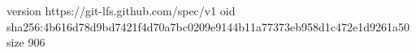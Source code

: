 version https://git-lfs.github.com/spec/v1
oid sha256:4b616d78d9bd7421f4d70a7bc0209e9144b11a77373eb958d1c472e1d9261a50
size 906
